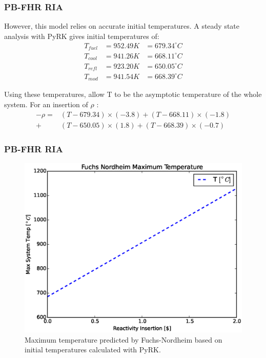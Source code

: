 \begin{frame}[fragile]
  \frametitle{PB-FHR RIA}
However, this model relies on accurate initial temperatures. A steady state
analysis with PyRK gives initial temperatures of:
\begin{align}
T_{fuel} &= 952.49 K &= 679.34 ^\circ C\\
T_{cool} &= 941.26 K &= 668.11 ^\circ C\\
T_{refl} &= 923.20 K &= 650.05 ^\circ C\\
T_{mod} &= 941.54 K  &= 668.39 ^\circ C
\end{align}

Using these temperatures, allow T to be the asymptotic temperature of the whole
system. For an insertion of $\rho$ :
\begin{align}
-\rho =& (T-679.34)\times(-3.8)+(T-668.11)\times(-1.8)\\
+&(T-650.05)\times(1.8)+(T-668.39)\times(-0.7)
\end{align}

\end{frame}
\begin{frame}[fragile]
  \frametitle{PB-FHR RIA}
  \begin{figure}[htbp!]
    \begin{center}
      \includegraphics[height=0.7\textheight]{./progress/fn.eps}
    \end{center}
    \caption{Maximum temperature predicted by Fuchs-Nordheim based on initial
    temperatures calculated with PyRK.}
    \label{fig:fn}
  \end{figure}
\end{frame}


